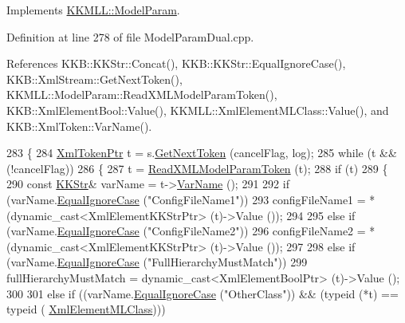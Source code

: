 Implements \hyperlink{class_k_k_m_l_l_1_1_model_param_a671c3ef465614d548e3730ca0427eb67}{K\+K\+M\+L\+L\+::\+Model\+Param}.



Definition at line 278 of file Model\+Param\+Dual.\+cpp.



References K\+K\+B\+::\+K\+K\+Str\+::\+Concat(), K\+K\+B\+::\+K\+K\+Str\+::\+Equal\+Ignore\+Case(), K\+K\+B\+::\+Xml\+Stream\+::\+Get\+Next\+Token(), K\+K\+M\+L\+L\+::\+Model\+Param\+::\+Read\+X\+M\+L\+Model\+Param\+Token(), K\+K\+B\+::\+Xml\+Element\+Bool\+::\+Value(), K\+K\+M\+L\+L\+::\+Xml\+Element\+M\+L\+Class\+::\+Value(), and K\+K\+B\+::\+Xml\+Token\+::\+Var\+Name().


\begin{DoxyCode}
283 \{
284   \hyperlink{class_k_k_b_1_1_xml_token}{XmlTokenPtr}  t = s.\hyperlink{class_k_k_b_1_1_xml_stream_a87cc738b05c666cf5d5c25beaab477b4}{GetNextToken} (cancelFlag, log);
285   \textcolor{keywordflow}{while}  (t  &&  (!cancelFlag))
286   \{
287     t = \hyperlink{class_k_k_m_l_l_1_1_model_param_a6d51128c4b26cb4c432091dc2e21415d}{ReadXMLModelParamToken} (t);
288     \textcolor{keywordflow}{if}  (t)
289     \{
290       \textcolor{keyword}{const} \hyperlink{class_k_k_b_1_1_k_k_str}{KKStr}&  varName = t->\hyperlink{class_k_k_b_1_1_xml_token_a28b39cfdfa2ed63048a812b1cb52263c}{VarName} ();
291 
292       \textcolor{keywordflow}{if}  (varName.\hyperlink{class_k_k_b_1_1_k_k_str_a562f9696417c53f66bc4088eac072ab5}{EqualIgnoreCase} (\textcolor{stringliteral}{"ConfigFileName1"}))
293         configFileName1 = *(dynamic\_cast<XmlElementKKStrPtr> (t)->Value ());
294 
295       \textcolor{keywordflow}{else} \textcolor{keywordflow}{if}  (varName.\hyperlink{class_k_k_b_1_1_k_k_str_a562f9696417c53f66bc4088eac072ab5}{EqualIgnoreCase} (\textcolor{stringliteral}{"ConfigFileName2"}))
296         configFileName2 = *(dynamic\_cast<XmlElementKKStrPtr> (t)->Value ());
297 
298       \textcolor{keywordflow}{else} \textcolor{keywordflow}{if}  (varName.\hyperlink{class_k_k_b_1_1_k_k_str_a562f9696417c53f66bc4088eac072ab5}{EqualIgnoreCase} (\textcolor{stringliteral}{"FullHierarchyMustMatch"}))
299         fullHierarchyMustMatch = dynamic\_cast<XmlElementBoolPtr> (t)->Value ();
300 
301       \textcolor{keywordflow}{else} \textcolor{keywordflow}{if}  ((varName.\hyperlink{class_k_k_b_1_1_k_k_str_a562f9696417c53f66bc4088eac072ab5}{EqualIgnoreCase} (\textcolor{stringliteral}{"OtherClass"}))  &&  (\textcolor{keyword}{typeid} (*t) == \textcolor{keyword}{typeid} (
      \hyperlink{class_k_k_m_l_l_1_1_xml_element_m_l_class}{XmlElementMLClass})))

\end{DoxyCode}
